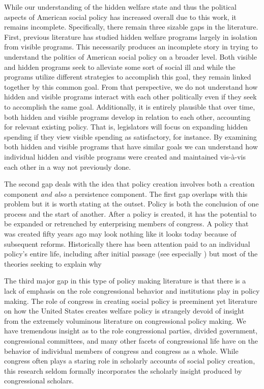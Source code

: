 \documentclass[12pt]{article}
\begin{document}
While our understanding of the hidden welfare state and thus the political aspects of American social policy has increased overall due to this work, it remains incomplete.  Specifically, there remain three sizable gaps in the literature. First, previous literature has studied hidden welfare programs largely in isolation from visible programs. This necessarily produces an incomplete story in trying to understand the politics of American social policy on a broader level. Both visible and hidden programs seek to alleviate some sort of social ill and while the programs utilize different strategies to accomplish this goal, they remain linked together by this common goal. From that perspective, we do not understand how hidden and visible programs interact with each other politically even if they seek to accomplish the same goal. Additionally, it is entirely plausible that over time, both hidden and visible programs develop in relation to each other, accounting for relevant existing policy. That is, legislators will focus on expanding hidden spending if they view visible spending as satisfactory, for instance. By examining both hidden and visible programs that have similar goals we can understand how individual hidden and visible programs were created and maintained vis-à-vis each other in a way not previously done.

The second gap deals with the idea that policy creation involves both a creation component \emph{and also} a persistence component. The first gap overlaps with this problem but it is worth stating at the outset. Policy is both the conclusion of one process and the start of another. After a policy is created, it has the potential to be expanded or retrenched by enterprising members of congress. A policy that was created fifty years ago may look nothing like it looks today because of subsequent reforms. Historically there has been attention paid to an individual policy's entire life, including after initial passage (see especially \cite{derthick1979}) but most of the theories seeking to explain why 

The third major gap in this type of policy making literature is that there is a lack of emphasis on the role congressional behavior and institutions play in policy making. The role of congress in creating social policy is preeminent yet literature on how the United States creates welfare policy is strangely devoid of insight from the extremely voluminous literature on congressional policy making. We have tremendous insight as to the role congressional parties, divided government, congressional committees, and many other facets of congressional life have on the behavior of individual members of congress and congress as a whole. While congress often plays a staring role in scholarly accounts of social policy creation, this research seldom formally incorporates the scholarly insight produced by congressional scholars.
\end{document}
